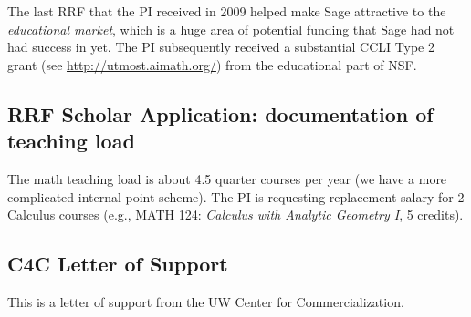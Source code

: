 \documentclass[11pt]{article}
\begin{document}
The last RRF that the PI received in 2009 helped make Sage attractive
to the {\em educational market}, which is a huge area of potential
funding that Sage had not had success in yet.  The PI subsequently
received a substantial CCLI Type 2 grant (see
\url{http://utmost.aimath.org/}) from the educational part of NSF.

\subsection{RRF Scholar Application: documentation of teaching load}
The math teaching load is about 4.5 quarter courses per year (we have
a more complicated internal point scheme).  The PI is requesting
replacement salary for 2 Calculus courses (e.g., MATH 124: {\em
  Calculus with Analytic Geometry I}, 5 credits).

\subsection{C4C Letter of Support}\label{sec:letter}
This is a letter of support from the UW Center for Commercialization.


\end{document}
